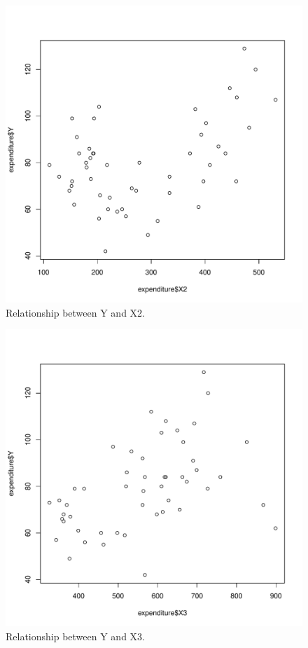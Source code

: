 \documentclass[12pt,letterpaper]{article}
\begin{document}
\begin{itemize}
\begin{figure}[hbtp!]\centering
	\caption{\footnotesize Relationship between Y and X2.}
	\label{fig:plot_2}
	\includegraphics[width=.75\textwidth]{plot_Y_X2.pdf}
\end{figure}

\begin{figure}[hbtp!]\centering
	\caption{\footnotesize Relationship between Y and X3.}
	\label{fig:plot_3}
	\includegraphics[width=.75\textwidth]{plot_Y_X3.pdf}
\end{figure}


\end{itemize}
\end{document}
